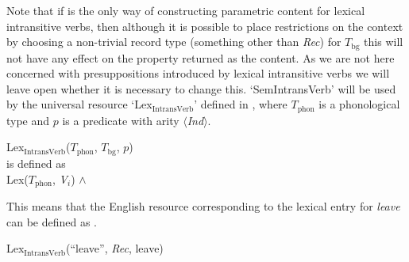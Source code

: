  
Note that if \preveg{} is the only way of constructing parametric content for
lexical intransitive verbs, then although it is possible to place
restrictions on the context by choosing a non-trivial record type
(something other than \textit{Rec}) for $T_{\mathrm{bg}}$ this will
not have any effect on the property returned as the content.  As we
are not here concerned with presuppositions introduced by lexical
intransitive verbs we will leave open whether it is necessary to
change this.  `SemIntransVerb' will be used by the universal resource
`Lex$_{\mathrm{IntransVerb}}$' defined in \nexteg{}, where
$T_{\mathrm{phon}}$ is a phonological type and $p$ is a predicate with
arity $\langle$\textit{Ind}$\rangle$.
\begin{ex} 
Lex$_{\mathrm{IntransVerb}}$($T_{\mathrm{phon}}$, $T_{\mathrm{bg}}$, $p$)\\
is defined as \\
Lex($T_{\mathrm{phon}}$, \textit{V$_i$}) \d{$\wedge$}
\end{ex}

This means that the English resource corresponding to the lexical
entry for \textit{leave} can be defined as \nexteg{}.
\begin{ex} 
Lex$_{\mathrm{IntransVerb}}$(``leave'', \textit{Rec}, leave) 
\end{ex} 



